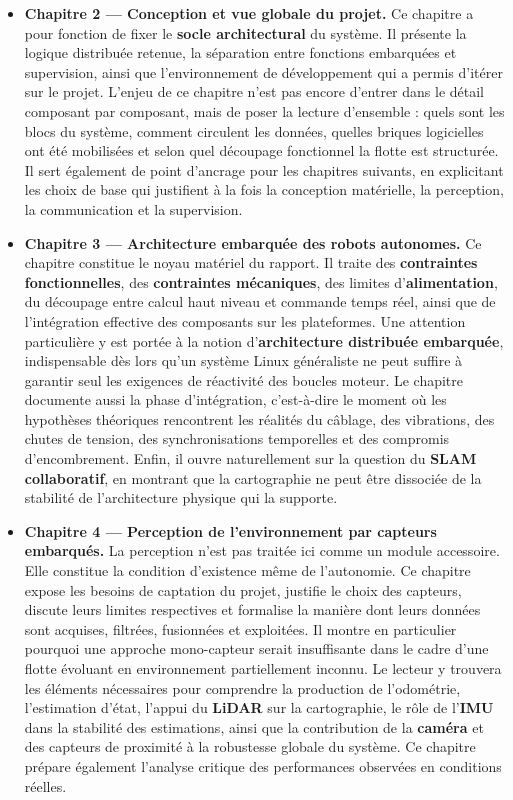 \documentclass[11pt,a4paper]{report}
\newcommand{\kw}[1]{\textbf{#1}}
\begin{document}
\begin{itemize}[leftmargin=1.2cm]
    \item \kw{Chapitre 2 --- Conception et vue globale du projet.}  
    Ce chapitre a pour fonction de fixer le \kw{socle architectural} du système. Il présente la logique distribuée retenue, la séparation entre fonctions embarquées et supervision, ainsi que l’environnement de développement qui a permis d’itérer sur le projet. L’enjeu de ce chapitre n’est pas encore d’entrer dans le détail composant par composant, mais de poser la lecture d’ensemble : quels sont les blocs du système, comment circulent les données, quelles briques logicielles ont été mobilisées et selon quel découpage fonctionnel la flotte est structurée. Il sert également de point d’ancrage pour les chapitres suivants, en explicitant les choix de base qui justifient à la fois la conception matérielle, la perception, la communication et la supervision.

    \item \kw{Chapitre 3 --- Architecture embarquée des robots autonomes.}  
    Ce chapitre constitue le noyau matériel du rapport. Il traite des \kw{contraintes fonctionnelles}, des \kw{contraintes mécaniques}, des limites d’\kw{alimentation}, du découpage entre calcul haut niveau et commande temps réel, ainsi que de l’intégration effective des composants sur les plateformes. Une attention particulière y est portée à la notion d’\kw{architecture distribuée embarquée}, indispensable dès lors qu’un système Linux généraliste ne peut suffire à garantir seul les exigences de réactivité des boucles moteur. Le chapitre documente aussi la phase d’intégration, c’est-à-dire le moment où les hypothèses théoriques rencontrent les réalités du câblage, des vibrations, des chutes de tension, des synchronisations temporelles et des compromis d’encombrement. Enfin, il ouvre naturellement sur la question du \kw{SLAM collaboratif}, en montrant que la cartographie ne peut être dissociée de la stabilité de l’architecture physique qui la supporte.

    \item \kw{Chapitre 4 --- Perception de l’environnement par capteurs embarqués.}  
    La perception n’est pas traitée ici comme un module accessoire. Elle constitue la condition d’existence même de l’autonomie. Ce chapitre expose les besoins de captation du projet, justifie le choix des capteurs, discute leurs limites respectives et formalise la manière dont leurs données sont acquises, filtrées, fusionnées et exploitées. Il montre en particulier pourquoi une approche mono-capteur serait insuffisante dans le cadre d’une flotte évoluant en environnement partiellement inconnu. Le lecteur y trouvera les éléments nécessaires pour comprendre la production de l’odométrie, l’estimation d’état, l’appui du \kw{LiDAR} sur la cartographie, le rôle de l’\kw{IMU} dans la stabilité des estimations, ainsi que la contribution de la \kw{caméra} et des capteurs de proximité à la robustesse globale du système. Ce chapitre prépare également l’analyse critique des performances observées en conditions réelles.


\end{itemize}
\end{document}
